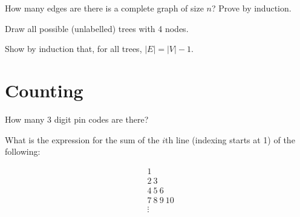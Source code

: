 \documentclass[solutionorbox,answers]{exam}
\begin{document}
\begin{questions}
\begin{minipage}{0.6\linewidth}
\begin{solutionbox}{3.8in}
\end{solutionbox}
\end{minipage}
\question
How many edges are there is a complete graph of size $n$? Prove by induction.

\begin{solutionbox}{3.8in}

\end{solutionbox}

\question
Draw all possible (unlabelled) trees with 4 nodes.

\begin{solutionbox}{3.8in}
  
\end{solutionbox}

\question
Show by induction that, for all trees, $|E| = |V| - 1$.

\begin{solutionbox}{3.8in}

\end{solutionbox}

\section*{Counting}
\label{sec:counting}

\question
How many 3 digit pin codes are there?

\begin{solutionbox}{0.5in}

\end{solutionbox}

\question
What is the expression for the sum of the $i$th line (indexing starts at 1) of the following: \\
\begin{minipage}{0.1\textwidth}
\begin{align*}
 & 1        \\
 & 2\ 3      \\
 & 4\ 5\ 6    \\
 & 7\ 8\ 9\ 10 \\
 & \vdots
\end{align*}
\end{minipage}
\begin{minipage}{0.89\linewidth}
  \begin{solutionbox}{2in} \\
  
\end{solutionbox}
\end{minipage}


\end{questions}
\end{document}
